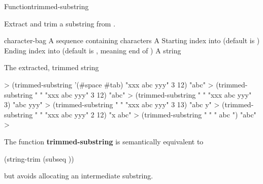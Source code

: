\documentclass[10pt,twoside,english,pdftex]{article}
\begin{document}

\begin{functiondoc}{Function}{trimmed-substring}%
  { 
     
    \returns{} }
% 

\fnsyntax

\fnpurpose Extract and trim a substring from .

\fnpackage {}

\fnmodule {}

\fnargs
\begin{args}{character-bag}
 A sequence containing characters
\arg[string] A 
\arg[start] Starting index into  (default is )
\arg[end] Ending index into  (default is \nil, meaning
end of )
 A string
\end{args}

\fnreturns The extracted, trimmed string

\fnexamples
%
\W\supp
\begin{example}
  > (trimmed-substring '(#\bkslash{}space #\bkslash{}tab) "xxx   abc   yyy" 3 12)
  "abc"
  > (trimmed-substring " " "xxx   abc   yyy" 3 12)
  "abc"\goodpagebreak
  > (trimmed-substring " " "xxx   abc   yyy" 3)
  "abc   yyy"\goodpagebreak
  > (trimmed-substring " " "xxx   abc   yyy" 3 13)
  "abc   y"
  > (trimmed-substring " " "xxx   abc   yyy" 2 12)
  "x   abc"
  > (trimmed-substring " " "   abc   ")
  "abc"
  >
\end{example}

\fnnote 
The function \textbf{trimmed-substring} is semantically equivalent to
%
\W\supp
\begin{example}
  (string-trim  (subseq ))
\end{example} 
%
but avoids allocating an intermediate substring.

\end{functiondoc}

\end{document}
